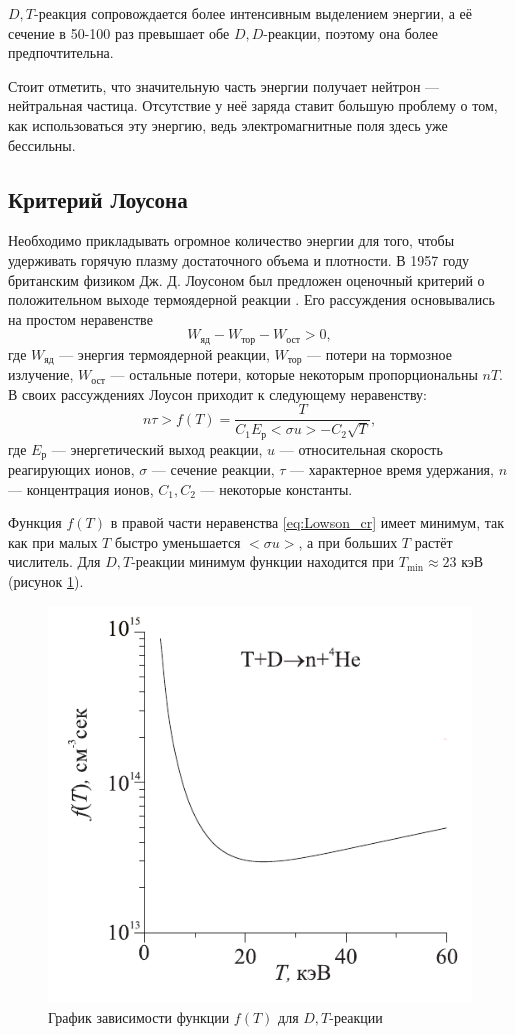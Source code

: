 $D,T$-реакция сопровождается более интенсивным выделением энергии, а её сечение  в 50-100 раз превышает обе $D,D$-реакции, поэтому она более предпочтительна.

Стоит отметить, что значительную часть энергии получает нейтрон --- нейтральная частица. Отсутствие у неё заряда ставит большую проблему о том, как использоваться эту энергию, ведь электромагнитные поля здесь уже бессильны.

\subsection{Критерий Лоусона}

Необходимо прикладывать огромное количество энергии для того, чтобы удерживать горячую плазму достаточного объема и плотности. В 1957 году британским физиком Дж. Д. Лоусоном  был предложен оценочный критерий о положительном выходе термоядерной реакции \cite{Lawson}. Его рассуждения основывались на простом неравенстве
\begin{equation}
W_{\text{яд}} - W_{\text{тор}} - W_{\text{ост}} > 0, 
\end{equation}
где $W_{\text{яд}}$ --- энергия термоядерной реакции, $W_{\text{тор}}$ --- потери на тормозное излучение,  $W_{\text{ост}}$ --- остальные потери, которые некоторым пропорциональны $nT$. В своих рассуждениях Лоусон приходит к следующему неравенству:
\begin{equation}
n \tau > f(T) = \frac{T}{C_1 E_{\text{р}} <\sigma u> - C_2 \sqrt{T}},
\label{eq:Lowson_cr}
\end{equation}
где $E_{\text{р}}$ --- энергетический выход реакции, $u$ --- относительная скорость реагирующих ионов, $\sigma$ --- сечение реакции, $\tau$ --- характерное время удержания, $n$ --- концентрация ионов, $C_1,C_2$ --- некоторые константы. 

Функция $f(T)$ в правой части неравенства \eqref{eq:Lowson_cr} имеет минимум, так как при малых $T$ быстро уменьшается $<\sigma u>$, а при больших $T$ растёт числитель. Для $D,T$-реакции минимум функции находится \cite{kotelnikov} при $T_{\min} \approx 23 \text{ кэВ}$ (рисунок \ref{fig:f_T_Lowson}). 

\begin{figure}
\centering
\includegraphics[width=0.5\linewidth]{./fig/ch1/f_T_Lowson}
\caption{График зависимости функции $f(T)$ для $D,T$-реакции}
\label{fig:f_T_Lowson}
\end{figure}


